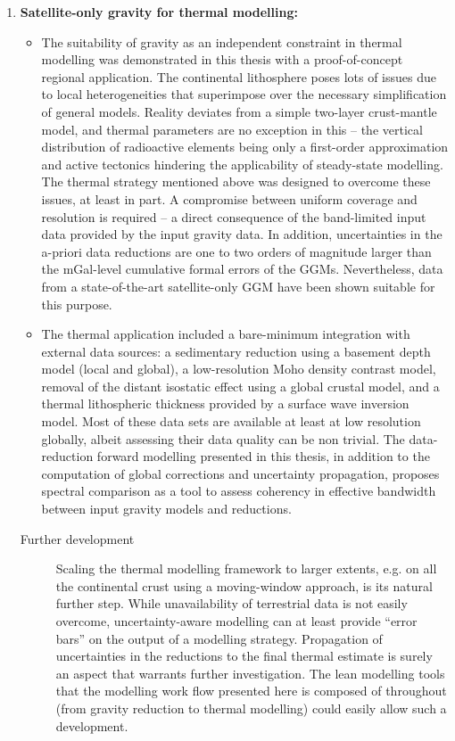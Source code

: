 \begin{enumerate}
    \item \textsf{\textbf{Satellite-only gravity for thermal modelling:}}
    \begin{itemize}
        \item The suitability of gravity as an independent constraint in thermal modelling was demonstrated in this thesis with a proof-of-concept regional application.
        The continental lithosphere poses lots of issues due to local heterogeneities that superimpose over the necessary simplification of general models.
        Reality deviates from a simple two-layer crust-mantle model, and thermal parameters are no exception in this -- the vertical distribution of radioactive elements being only a first-order approximation \parencites{Jaupart2003}{Alessio2018deepRHP} and active tectonics hindering the applicability of steady-state modelling.
        The thermal strategy mentioned above was designed to overcome these issues, at least in part.
        A compromise between uniform coverage and resolution is required -- a direct consequence of the band-limited input data provided by the input gravity data.
        In addition, uncertainties in the a-priori data reductions are one to two orders of magnitude larger than the \si{mGal}-level cumulative formal errors of the GGMs.
        Nevertheless, data from a state-of-the-art satellite-only GGM have been shown suitable for this purpose.
        \item  The thermal application included a bare-minimum integration with external data sources: a sedimentary reduction using a basement depth model (local and global), a low-resolution Moho density contrast model, removal of the distant isostatic effect using a global crustal model, and a thermal lithospheric thickness provided by a surface wave inversion model.
        Most of these data sets are available at least at low resolution globally, albeit assessing their data quality can be non trivial.
        The data-reduction forward modelling presented in this thesis, in addition to the computation of global corrections and uncertainty propagation, proposes spectral comparison as a tool to assess coherency in effective bandwidth between input gravity models and reductions.
    \end{itemize}
    \begin{description}
        \item[\quad Further development]
            Scaling the thermal modelling framework to larger extents, e.g. on all the continental crust using a moving-window approach, is its natural further step.
            While unavailability of terrestrial data is not easily overcome, uncertainty-aware modelling can at least provide ``error bars'' on the output of a modelling strategy.
            Propagation of uncertainties in the reductions to the final thermal estimate is surely an aspect that warrants further investigation.
            The lean modelling tools that the modelling work flow presented here is composed of throughout (from gravity reduction to thermal modelling) could easily allow such a development.
    \end{description}
\end{enumerate}

